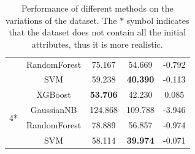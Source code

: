 \documentclass[conference,compsoc]{IEEEtran}
\begin{document}
\begin{table}[!t]
\begin{tabular}{c|c|c|c|c}
& RandomForest & 75.167 & 54.669 & -0.792 \\
& SVM & 59.238 & \textbf{40.390} & -0.113 \\
\hline
\multirow{4}{*}{4*}
& XGBoost & \textbf{53.706} & 42.230 & 0.085 \\
& GaussianNB & 124.868 & 109.788 & -3.946 \\
& RandomForest & 78.889 & 56.857 & -0.974 \\
& SVM & 58.114 & \textbf{39.974} & -0.071 \\
\end{tabular}
\renewcommand{\arraystretch}{1.3}
\caption{Performance of different methods on the variations of the dataset. The $*$ symbol indicates that the dataset does not contain all the initial attributes, thus it is more realistic.}
\label{table_example}
\end{table}



\end{document}
